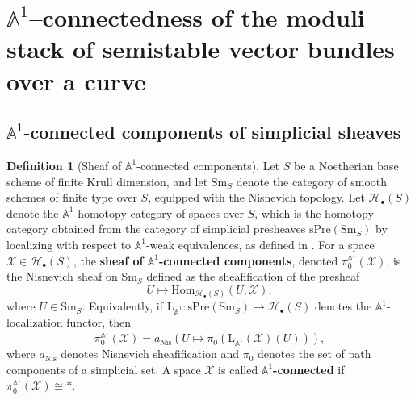 \documentclass[12pt,reqno]{amsart}
\newcommand{\bb}[1]{\mathbb{#1}}
\theoremstyle{definition}
\newtheorem{definition}[theorem]{Definition}
\numberwithin{equation}{section}
\begin{document}

	\section{$\bb{A}^1$--connectedness of the moduli stack of semistable
		vector bundles over a curve}
	\label{section:a1-connectedness}
	
	\subsection{$\bb{A}^1$-connected components of simplicial sheaves}
	
	\begin{definition}[Sheaf of $\mathbb{A}^1$-connected components]
		\label{def:a1-connected-components}
		Let $S$ be a Noetherian base scheme of finite Krull dimension, and let
		$\mathrm{Sm}_S$ denote the category of smooth schemes of finite type over
		$S$, equipped with the Nisnevich topology. Let $\mathcal{H}_{\bullet}(S)$
		denote the $\mathbb{A}^1$-homotopy category of spaces over $S$, which is the
		homotopy category obtained from the category of simplicial presheaves
		$\mathrm{sPre}(\mathrm{Sm}_S)$ by localizing with respect to
		$\mathbb{A}^1$-weak equivalences, as defined in \cite{MV99}. For a space
		$\mathcal{X} \in \mathcal{H}_{\bullet}(S)$, the \textbf{sheaf of
			$\mathbb{A}^1$-connected components}, denoted $\pi_0^{\mathbb{A}^1}(\mathcal{X})$,
		is the Nisnevich sheaf on $\mathrm{Sm}_S$ defined as the sheafification of
		the presheaf
		\[
		U \longmapsto \mathrm{Hom}_{\mathcal{H}_{\bullet}(S)}(U, \mathcal{X}),
		\]
		where $U \in \mathrm{Sm}_S$. Equivalently, if
		$\mathrm{L}_{\mathbb{A}^1}: \mathrm{sPre}(\mathrm{Sm}_S) \to
		\mathcal{H}_{\bullet}(S)$ denotes the $\mathbb{A}^1$-localization functor,
		then
		\[
		\pi_0^{\mathbb{A}^1}(\mathcal{X}) = a_{\mathrm{Nis}}
		\!\left(U \mapsto \pi_0\!\left(\mathrm{L}_{\mathbb{A}^1}(\mathcal{X})(U)
		\right)\right),
		\]
		where $a_{\mathrm{Nis}}$ denotes Nisnevich sheafification and $\pi_0$
		denotes the set of path components of a simplicial set. A space $\mathcal{X}$
		is called \textbf{$\mathbb{A}^1$-connected} if
		$\pi_0^{\mathbb{A}^1}(\mathcal{X}) \cong *$.
	\end{definition}
	
\end{document}
